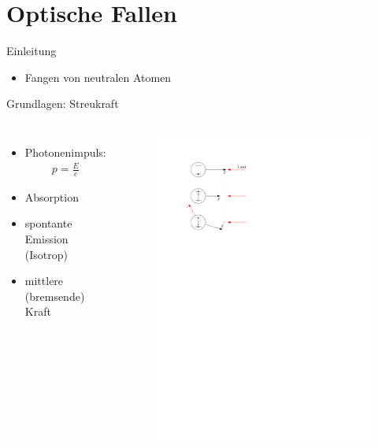 \documentclass[12pt,xcolor=dvipsnames]{beamer}
\begin{document}
\section{Optische Fallen}

\begin{frame}{Einleitung}
	\begin{itemize}
		\item Fangen von neutralen Atomen
	\end{itemize}
\end{frame}

\begin{frame}{Grundlagen: Streukraft}
	\begin{columns}[t]
		\begin{itemize}
			\item Photonenimpuls:
			\begin{align}
			p = \frac{E}{c}
			\end{align}
			\item Absorption
			\item spontante Emission (Isotrop)
			\item mittlere (bremsende) Kraft
		\end{itemize}
		
		\begin{figure}[h]
			\centering
			\includegraphics[width=1.0\textwidth]{./figures/streukraft.pdf}
		\end{figure}
		

\end{columns}
\end{frame}
\end{document}
